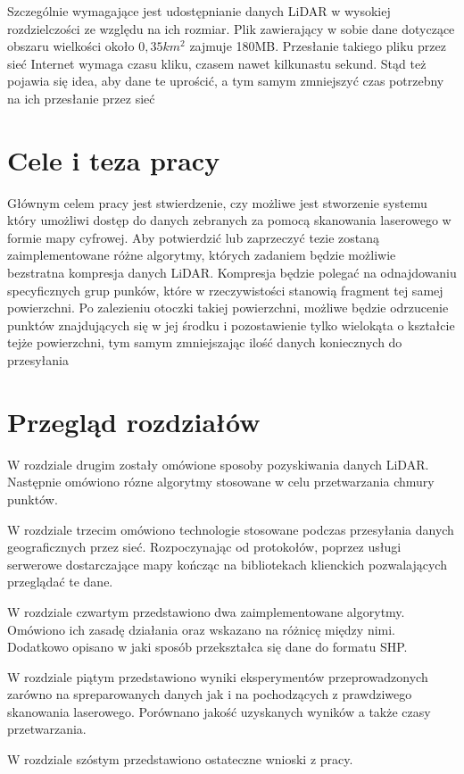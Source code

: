 Szczególnie wymagające jest udostępnianie danych LiDAR w wysokiej rozdzielczości ze względu na ich rozmiar. Plik zawierający
w sobie dane dotyczące obszaru wielkości około $0,35km^2$ zajmuje 180MB. Przesłanie takiego pliku przez sieć Internet wymaga
czasu kliku, czasem nawet kilkunastu sekund. Stąd też pojawia się idea, aby dane te uprościć, a tym samym zmniejszyć czas potrzebny
na ich przesłanie przez sieć

\section{Cele i teza pracy}

Głównym celem pracy jest stwierdzenie, czy możliwe jest stworzenie systemu który umożliwi dostęp do danych zebranych za pomocą
skanowania laserowego w formie mapy cyfrowej. Aby potwierdzić lub zaprzeczyć tezie zostaną zaimplementowane różne algorytmy, których
zadaniem będzie możliwie bezstratna kompresja danych LiDAR. Kompresja będzie polegać na odnajdowaniu specyficznych grup punków, które
w rzeczywistości stanowią fragment tej samej powierzchni. Po zalezieniu otoczki takiej powierzchni, możliwe będzie odrzucenie punktów
znajdujących się w jej środku i pozostawienie tylko wielokąta o kształcie tejże powierzchni, tym samym zmniejszając ilość danych
koniecznych do przesyłania

\section{Przegląd rozdziałów}

W rozdziale drugim zostały omówione sposoby pozyskiwania danych LiDAR.
Następnie omówiono rózne algorytmy stosowane w celu przetwarzania chmury punktów.

W rozdziale trzecim omówiono technologie stosowane podczas przesyłania danych geograficznych przez sieć. Rozpoczynając od protokołów,
poprzez usługi serwerowe dostarczające mapy kończąc na bibliotekach klienckich pozwalających przeglądać te dane.

W rozdziale czwartym przedstawiono dwa zaimplementowane algorytmy. Omówiono ich zasadę działania oraz wskazano na różnicę między nimi.
Dodatkowo opisano w jaki sposób przekształca się dane do formatu SHP.

W rozdziale piątym przedstawiono wyniki eksperymentów przeprowadzonych zarówno na spreparowanych danych jak i na pochodzących z prawdziwego
skanowania laserowego. Porównano jakość uzyskanych wyników a także czasy przetwarzania.

W rozdziale szóstym przedstawiono ostateczne wnioski z pracy.
